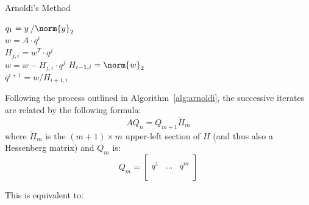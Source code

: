 \begin{algorithm}[h]
  \caption{Arnoldi's Method}
  \label{alg:arnoldi}
  \SetAlgoLined
  $q_1= y\:/\norm{y}_2$ \\
   {
    $w =A\cdot q^i$ \\
     {
      $H_{j,i} = w^T\cdot q^j$ \\
      $ w = w - H_{j,i}\cdot q^j$}
    $H_{i-1,i} = \norm{w}_2$ \\
    $q^{i+1} = w/H_{i+1,i}$
  }
\end{algorithm}

\noindent Following the process outlined in Algorithm~\hyperref[alg:arnoldi]{\ref{alg:arnoldi}}, the successive iterates are related by the following formula:
\begin{equation}
\label{eqn:arnoldi}
AQ_n=Q_{m+1}\tilde{H}_m
\end{equation}
\noindent where $\tilde{H}_m$ is the $(m+1) \times m$ upper-left section of $H$ (and thus also a Hessenberg matrix) and $Q_m$ is:
\begin{equation}
  Q_m =
  \left[
    \begin{array}{c|c|c}
      & & \\
      q^1 &\dots & q^m \\
      & & \\
    \end{array}
  \right] 
\end{equation}

\noindent This is equivalent to:

